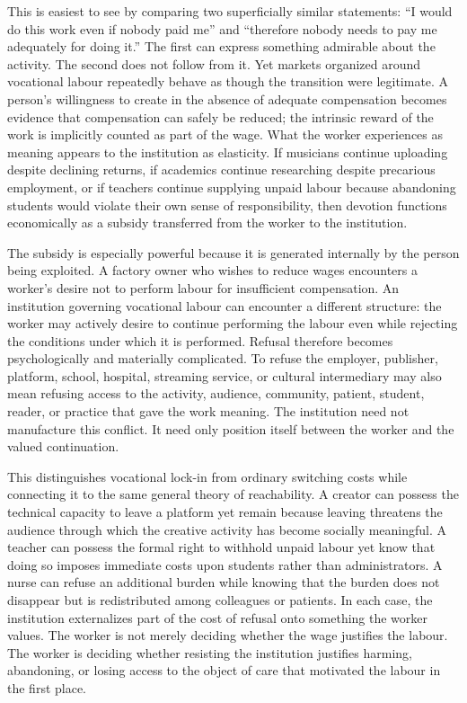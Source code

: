 \documentclass[11pt]{article}
\begin{document}
This is easiest to see by comparing two superficially similar statements: ``I would do this work even if nobody paid me'' and ``therefore nobody needs to pay me adequately for doing it.'' The first can express something admirable about the activity. The second does not follow from it. Yet markets organized around vocational labour repeatedly behave as though the transition were legitimate. A person's willingness to create in the absence of adequate compensation becomes evidence that compensation can safely be reduced; the intrinsic reward of the work is implicitly counted as part of the wage. What the worker experiences as meaning appears to the institution as elasticity. If musicians continue uploading despite declining returns, if academics continue researching despite precarious employment, or if teachers continue supplying unpaid labour because abandoning students would violate their own sense of responsibility, then devotion functions economically as a subsidy transferred from the worker to the institution.

The subsidy is especially powerful because it is generated internally by the person being exploited. A factory owner who wishes to reduce wages encounters a worker's desire not to perform labour for insufficient compensation. An institution governing vocational labour can encounter a different structure: the worker may actively desire to continue performing the labour even while rejecting the conditions under which it is performed. Refusal therefore becomes psychologically and materially complicated. To refuse the employer, publisher, platform, school, hospital, streaming service, or cultural intermediary may also mean refusing access to the activity, audience, community, patient, student, reader, or practice that gave the work meaning. The institution need not manufacture this conflict. It need only position itself between the worker and the valued continuation.

This distinguishes vocational lock-in from ordinary switching costs while connecting it to the same general theory of reachability. A creator can possess the technical capacity to leave a platform yet remain because leaving threatens the audience through which the creative activity has become socially meaningful. A teacher can possess the formal right to withhold unpaid labour yet know that doing so imposes immediate costs upon students rather than administrators. A nurse can refuse an additional burden while knowing that the burden does not disappear but is redistributed among colleagues or patients. In each case, the institution externalizes part of the cost of refusal onto something the worker values. The worker is not merely deciding whether the wage justifies the labour. The worker is deciding whether resisting the institution justifies harming, abandoning, or losing access to the object of care that motivated the labour in the first place.
\end{document}
